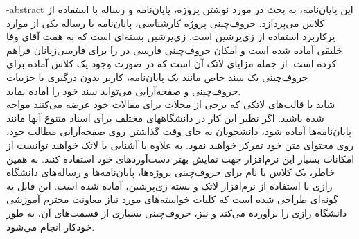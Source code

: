 \fa-abstract{
این پایان‌نامه، به بحث در مورد نوشتن پروژه، پایان‌نامه و رساله با استفاده از کلاس 
می‌پردازد.
حروف‌چینی پروژه کارشناسی، پایان‌نامه یا رساله یکی از موارد پرکاربرد استفاده از زی‌پرشین است. 
زی‌پرشین بسته‌ای است که به همت آقای وفا خلیقی آماده شده است و امکان حروف‌چینی فارسی در \lr{\LaTeXe}{} را  برای فارسی‌زبانان فراهم کرده است.
از جمله مزایای لاتک آن است که در صورت وجود یک کلاس آماده برای حروف‌چینی یک سند خاص مانند یک پایان‌نامه، کاربر بدون درگیری با جزییات حروف‌چینی و صفحه‌آرایی می‌تواند سند خود را آماده نماید.
\\
\indent
شاید با قالب‌های لاتکی که برخی از مجلات برای مقالات خود عرضه می‌کنند مواجه شده باشید. اگر نظیر این کار در دانشگاههای مختلف برای اسناد متنوع آنها مانند پایا‌ن‌نامه‌ها آماده شود، دانشجویان به جای وقت گذاشتن روی صفحه‌آرایی مطالب خود، روی محتوای متن خود تمرکز خواهند نمود. به علاوه با آشنایی با لاتک خواهند توانست از امکانات بسیار این نرم‌افزار جهت نمایش بهتر دست‌آوردهای خود استفاده کنند.
به همین خاطر، یک کلاس با نام 
 برای حروف‌چینی پروژه‌ها، پایان‌نامه‌ها و رساله‌های دانشگاه رازی با استفاده از نرم‌افزار لاتک و بسته زی‌پرشین،  آماده شده است. این فایل به 
گونه‌ای طراحی شده است که کلیات خواسته‌های مورد نیاز  معاونت محترم آموزشی دانشگاه رازی را برآورده می‌کند و نیز، حروف‌چینی بسیاری از قسمت‌های آن، به طور خودکار انجام می‌شود.
}

\abstractPage

\newpage\clearpage